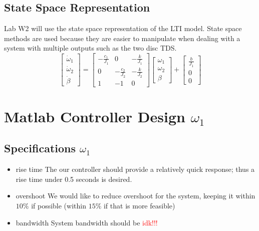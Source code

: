\documentclass[11pt,titlepage]{article}
\begin{document}
	\subsection{State Space Representation}
		Lab W2 will use the state space representation of the LTI model. State space methods are used because they are easier to manipulate when dealing with a system with multiple outputs such as the two disc TDS.
		\begin{equation}
			\begin{bmatrix}
				\dot \omega_1\\
				\dot \omega_2\\
				\dot \beta
			\end{bmatrix}=
	  		\begin{bmatrix}
	    		-\frac{c_1}{J_1} & 0 & -\frac{k}{J_1} \\
		    	0 & -\frac{c_2}{J_2} & -\frac{k}{J_2}\\
				1 & -1 & 0
	  		\end{bmatrix}
			\begin{bmatrix}
				\omega_1\\
				\omega_2\\
				\beta
			\end{bmatrix}+
			\begin{bmatrix}
				\frac{b}{J_1}\\
				0\\
				0
			\end{bmatrix}
		\end{equation}

\section{Matlab Controller Design $\omega_1$}
	
	\subsection{Specifications $\omega_1$}
		\begin{itemize}
			\item rise time
			The our controller should provide a relatively quick response; thus a rise time under 0.5 seconds is desired. 
			\item overshoot
			We would like to reduce overshoot for the system, keeping it within $10\%$ if possible (within $15\%$ if that is more feasible)
			\item bandwidth
			System bandwidth should be \textcolor{red}{idk!!!}
		\end{itemize}
		
\end{document}
